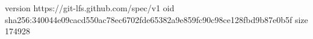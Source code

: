 version https://git-lfs.github.com/spec/v1
oid sha256:340044e09cacd550ac78ec6702fde65382a9e859fc90c98ce128fbd9b87e0b5f
size 174928
